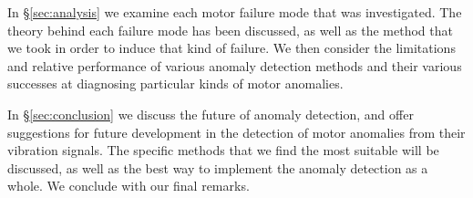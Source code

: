 In \S\ref{sec:analysis} we examine each motor failure mode that was investigated. The theory behind each failure mode has been discussed, as well as the method that we took in order to induce that kind of failure. We then consider the limitations and relative performance of various anomaly detection methods and their various successes at diagnosing particular kinds of motor anomalies.

In \S\ref{sec:conclusion} we discuss the future of anomaly detection, and offer suggestions for future development in the detection of motor anomalies from their vibration signals. The specific methods that we find the most suitable will be discussed, as well as the best way to implement the anomaly detection as a whole. We conclude with our final remarks.